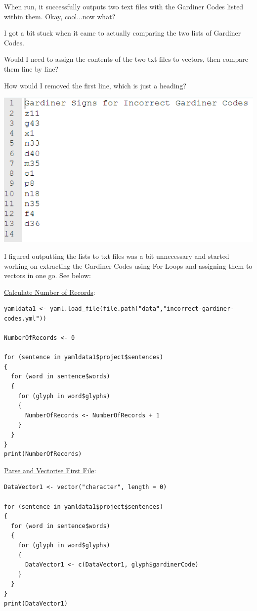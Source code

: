 \documentclass{article}
\begin{document}
When run, it successfully outputs two text files with the Gardiner Codes listed within them. Okay, cool...now what?

{\item I got a bit stuck when it came to actually comparing the two lists of Gardiner Codes.
\item Would I need to assign the contents of the two txt files to vectors, then compare them line by line?
\item How would I removed the first line, which is just a heading?}

\includegraphics[width=1.0\textwidth]{rstudio_51.PNG}

I figured outputting the lists to txt files was a bit unnecessary and started working on extracting the Gardiner Codes using For Loops and assigning them to vectors in one go. See below:

\underline{Calculate Number of Records}:

\begin{verbatim}
yamldata1 <- yaml.load_file(file.path("data","incorrect-gardiner-codes.yml"))

NumberOfRecords <- 0

for (sentence in yamldata1$project$sentences)
{
  for (word in sentence$words)
  {
    for (glyph in word$glyphs)
    {
      NumberOfRecords <- NumberOfRecords + 1
    }
  }
}
print(NumberOfRecords)
\end{verbatim}

\underline{Parse and Vectorise First File}:

\begin{verbatim}
DataVector1 <- vector("character", length = 0)

for (sentence in yamldata1$project$sentences)
{
  for (word in sentence$words)
  {
    for (glyph in word$glyphs)
    {
      DataVector1 <- c(DataVector1, glyph$gardinerCode)
    }
  }
}
print(DataVector1)
\end{verbatim}
\end{document}
